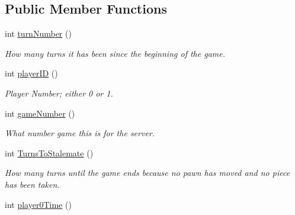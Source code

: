 \subsection*{Public Member Functions}
\begin{DoxyCompactItemize}
\item 
\hypertarget{classBaseAI_a19ade7391bfe101884a35f48fb840199}{
int \hyperlink{classBaseAI_a19ade7391bfe101884a35f48fb840199}{turnNumber} ()}
\label{classBaseAI_a19ade7391bfe101884a35f48fb840199}

\begin{DoxyCompactList}\small\item\em How many turns it has been since the beginning of the game. \item\end{DoxyCompactList}\item 
\hypertarget{classBaseAI_a16aab1036653c8f8fb5370cf2f6a3e10}{
int \hyperlink{classBaseAI_a16aab1036653c8f8fb5370cf2f6a3e10}{playerID} ()}
\label{classBaseAI_a16aab1036653c8f8fb5370cf2f6a3e10}

\begin{DoxyCompactList}\small\item\em Player Number; either 0 or 1. \item\end{DoxyCompactList}\item 
\hypertarget{classBaseAI_a50d3091db33b93c6f7c2d11dd64b4c7a}{
int \hyperlink{classBaseAI_a50d3091db33b93c6f7c2d11dd64b4c7a}{gameNumber} ()}
\label{classBaseAI_a50d3091db33b93c6f7c2d11dd64b4c7a}

\begin{DoxyCompactList}\small\item\em What number game this is for the server. \item\end{DoxyCompactList}\item 
\hypertarget{classBaseAI_a21e92638c7b53df6bbb2116c1f0f51c7}{
int \hyperlink{classBaseAI_a21e92638c7b53df6bbb2116c1f0f51c7}{TurnsToStalemate} ()}
\label{classBaseAI_a21e92638c7b53df6bbb2116c1f0f51c7}

\begin{DoxyCompactList}\small\item\em How many turns until the game ends because no pawn has moved and no piece has been taken. \item\end{DoxyCompactList}\item 
\hypertarget{classBaseAI_a0c98c065f57b1519d6daf72ef1c71d71}{
int \hyperlink{classBaseAI_a0c98c065f57b1519d6daf72ef1c71d71}{player0Time} ()}
\label{classBaseAI_a0c98c065f57b1519d6daf72ef1c71d71}


\end{DoxyCompactItemize}
